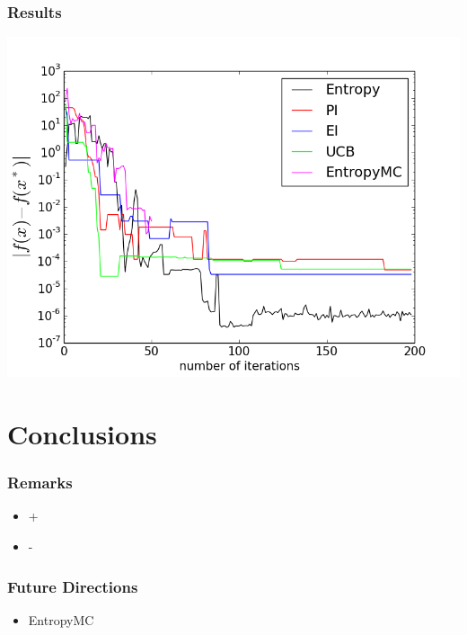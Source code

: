 \documentclass[10pt,handout]{beamer}
\begin{document}
\begin{frame}
\frametitle{Results}
 
\includegraphics[width=\textwidth]{plot_branin1.png}

\end{frame}



\section{Conclusions}


\begin{frame}
\frametitle{Remarks}

\begin{itemize}[<+->]
	\item +
	\item -

\end{itemize}


\end{frame}


\begin{frame}
\frametitle{Future Directions}

\begin{itemize}
	\item EntropyMC
\end{itemize}

\end{frame}
\end{document}
